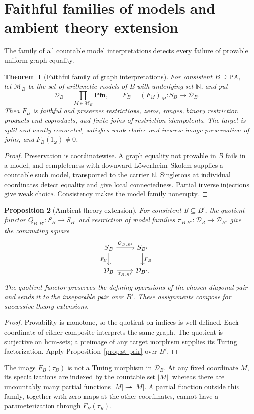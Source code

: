 \documentclass[11pt]{article}
\newtheorem{theorem}{Theorem}[section]
\newtheorem{proposition}[theorem]{Proposition}
\theoremstyle{definition}\newtheorem{definition}[theorem]{Definition}
\newcommand{\PA}{\mathrm{PA}}
\newcommand{\N}{\mathbb N}
\newcommand{\Pfn}{\mathbf{Pfn}}
\newcommand{\D}{\mathcal D}
\begin{document}
\section{Faithful families of models and ambient theory extension}
The family of all countable model interpretations detects every
failure of provable uniform graph equality.

\begin{theorem}[Faithful family of graph interpretations]
For consistent $B\supseteq\PA$, let $\mathcal M_B$ be the set
of arithmetic models of $B$ with underlying set $\N$, and put
\[
 \D_B=\prod_{M\in\mathcal M_B}\Pfn,
 \qquad F_B=(F_M)_M:S_B\to\D_B.
\]
Then $F_B$ is faithful and preserves restrictions, zeros, ranges,
binary restriction products and coproducts, and finite joins of
restriction idempotents. The target is split and locally connected, satisfies
weak choice and inverse-image preservation of joins, and
$F_B(1_\omega)\ne0$.
\end{theorem}
\begin{proof}
Preservation is coordinatewise. A graph equality not provable in
$B$ fails in a model, and completeness with downward
L\"owenheim--Skolem supplies a countable such model, transported
to the carrier $\N$. Singletons at individual coordinates detect
equality and give local connectedness. Partial inverse injections
give weak choice. Consistency makes the model family nonempty.
\end{proof}

\begin{proposition}[Ambient theory extension]
For consistent $B\subseteq B'$, the quotient functor
$Q_{B,B'}:S_B\to S_{B'}$ and restriction of model families
$\pi_{B,B'}:\D_B\to\D_{B'}$ give the commuting square
\[
\begin{tikzcd}
 S_B\arrow[r,"Q_{B,B'}"]\arrow[d,"F_B"'] & S_{B'}\arrow[d,"F_{B'}"]\\
 \D_B\arrow[r,"\pi_{B,B'}"'] & \D_{B'}.
\end{tikzcd}
\]
The quotient functor preserves the defining operations of the
chosen diagonal pair and sends it to the inseparable pair over
$B'$. These assignments compose for successive theory extensions.
\end{proposition}
\begin{proof}
Provability is monotone, so the quotient on indices is well defined.
Each coordinate of either composite interprets the same graph.
The quotient is surjective on hom-sets; a preimage of any target
morphism supplies its Turing factorization. Apply
Proposition~\ref{prop:st-pair} over $B'$.
\end{proof}
The image $F_B(\tau_B)$ is not a Turing morphism in $\D_B$.
At any fixed coordinate $M$, its specializations are indexed by
the countable set $|M|$, whereas there are uncountably many partial
functions $|M|\rightharpoonup|M|$. A partial function outside this
family, together with zero maps at the other coordinates, cannot
have a parameterization through $F_B(\tau_B)$.
\end{document}
